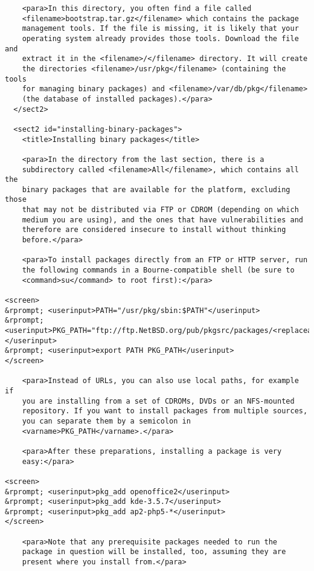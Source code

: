 \begin{verbatim}
    <para>In this directory, you often find a file called
    <filename>bootstrap.tar.gz</filename> which contains the package
    management tools. If the file is missing, it is likely that your
    operating system already provides those tools. Download the file and
    extract it in the <filename>/</filename> directory. It will create
    the directories <filename>/usr/pkg</filename> (containing the tools
    for managing binary packages) and <filename>/var/db/pkg</filename>
    (the database of installed packages).</para>
  </sect2>

  <sect2 id="installing-binary-packages">
    <title>Installing binary packages</title>

    <para>In the directory from the last section, there is a
    subdirectory called <filename>All</filename>, which contains all the
    binary packages that are available for the platform, excluding those
    that may not be distributed via FTP or CDROM (depending on which
    medium you are using), and the ones that have vulnerabilities and
    therefore are considered insecure to install without thinking
    before.</para>

    <para>To install packages directly from an FTP or HTTP server, run
    the following commands in a Bourne-compatible shell (be sure to
    <command>su</command> to root first):</para>

<screen>
&rprompt; <userinput>PATH="/usr/pkg/sbin:$PATH"</userinput>
&rprompt; <userinput>PKG_PATH="ftp://ftp.NetBSD.org/pub/pkgsrc/packages/<replaceable>OPSYS</replaceable>/<replaceable>ARCH</replaceable>/<replaceable>VERSIONS</replaceable>/All"</userinput>
&rprompt; <userinput>export PATH PKG_PATH</userinput>
</screen>

    <para>Instead of URLs, you can also use local paths, for example if
    you are installing from a set of CDROMs, DVDs or an NFS-mounted
    repository. If you want to install packages from multiple sources,
    you can separate them by a semicolon in
    <varname>PKG_PATH</varname>.</para>

    <para>After these preparations, installing a package is very
    easy:</para>

<screen>
&rprompt; <userinput>pkg_add openoffice2</userinput>
&rprompt; <userinput>pkg_add kde-3.5.7</userinput>
&rprompt; <userinput>pkg_add ap2-php5-*</userinput>
</screen>

    <para>Note that any prerequisite packages needed to run the
    package in question will be installed, too, assuming they are
    present where you install from.</para>


\end{verbatim}
